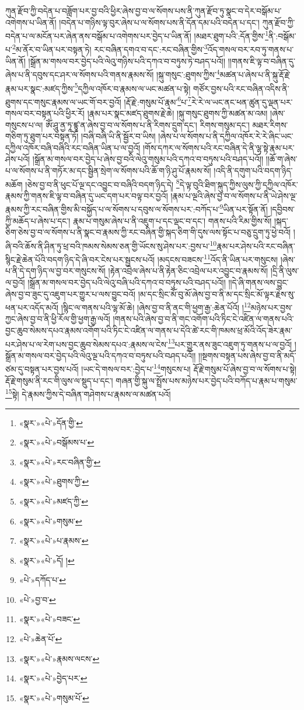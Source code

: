 ཀུན་རྫོབ་ཀྱི་བདེན་པ་བཟློག་པར་བྱ་བའི་ཕྱིར་ཞེས་བྱ་བ་ལ་སོགས་པས་ནི་ཀུན་རྫོབ་ཏུ་སྣང་བ་དེར་བསྒོམ་པ་འགེགས་པ་ཡིན་ནོ། །བདེན་པ་གཉིས་ལྟ་བུར་ཞེས་པ་ལ་སོགས་པས་ནི་དོན་དམ་པའི་བདེན་པ་དང་། ཀུན་རྫོབ་ཀྱི་བདེན་པ་ལ་མངོན་པར་ཞེན་ནས་བསྒོམ་པ་འགེགས་པར་བྱེད་པ་ཡིན་ནོ། །མཐར་ཐུག་པའི་:དོན་གྱིས་\footnote{«སྣར་»«པེ་»དོན་གྱི་}ནི་:བསྒོམ་པ་\footnote{«སྣར་»«པེ་»བསྒོམས་པ་}མ་ནོར་བ་ཡིན་པར་བསྟན་ཏེ། རང་བཞིན་དགའ་བ་དང་:རང་བཞིན་གྱིས་\footnote{«སྣར་»«པེ་»རང་བཞིན་གྱི་}འོད་གསལ་བར་རབ་ཏུ་གནས་པ་ཡིན་ནོ། །སྒྲོན་མ་གསལ་བར་བྱེད་པའི་ལེའུ་གཉིས་པའི་དཀའ་བ་བཏུས་ཏེ་བཤད་པའོ།། །།གནས་ཇི་ལྟ་བ་བཞིན་དུ་ཞེས་པ་ནི་དབུས་དང་ཤར་ལ་སོགས་པའི་གནས་རྣམས་སོ། །སྐུ་གསུང་:ཐུགས་ཀྱིས་\footnote{«སྣར་»«པེ་»ཐུགས་ཀྱི་}མཚན་པ་ཞེས་པ་ནི་སྐུ་རྡོ་རྗེ་རྣམ་པར་སྣང་:མཛད་ཀྱིས་\footnote{«སྣར་»«པེ་»མཛད་ཀྱི་}དཀྱིལ་འཁོར་བ་རྣམས་ལ་ཡང་མཚན་པ་སྟེ། གཙོར་བྱས་པའི་རང་བཞིན་འདིས་ནི་ཐུགས་དང་གསུང་རྣམས་ལ་ཡང་གོ་བར་བྱའོ། །རྡོ་རྗེ་:གསུམ་པོ་རྣམ་\footnote{«སྣར་»«པེ་»གསུམ་}པ་\footnote{«སྣར་»«པེ་»པ་རྣམས་}རེ་རེ་ལ་ཡང་ནང་ཕན་ཚུན་དུ་ལྡན་པར་གསལ་བར་བསྟན་པའི་ཕྱིར་རོ། །རྣམ་པར་སྣང་མཛད་ཐུགས་རྗེ་ཆེ། །སྐུ་གསུང་ཐུགས་ཀྱི་མཚན་མ་འམ། །ཞེས་གསུངས་པ་ལ། ཨོཾ་ཤཱུ་ནྱ་ཏཱ་ཛྙཱ་ན་ཞེས་བྱ་བ་ལ་སོགས་པ་ནི་རིགས་དྲུག་དང་། རིགས་གསུམ་དང་། མཐར་རིགས་གཅིག་ཏུ་ཐུག་པར་བསྟན་ཏོ། །བཞི་བཞི་ཡི་ནི་སྦྱོར་བ་ཡིས། །ཞེས་པ་ལ་སོགས་པ་ནི་དཀྱིལ་འཁོར་རེ་རེ་ཞིང་ཡང་དཀྱིལ་འཁོར་བཞི་བཞིའི་རང་བཞིན་ཡིན་པ་ལ་བྱའོ། །གོས་དཀར་ལ་སོགས་པའི་རང་བཞིན་དེ་ནི་ལྷ་སྟེ་རྣམ་པར་ཤེས་པའོ། །སྒྲོན་མ་གསལ་བར་བྱེད་པ་ཞེས་བྱ་བའི་ལེའུ་གསུམ་པའི་དཀའ་བ་བཏུས་པའི་བཤད་པའོ།། །།ཆོ་ག་ཞེས་པ་ལ་སོགས་པ་ནི་གཏོར་མ་དང་སྦྱིན་སྲེག་ལ་སོགས་པའི་ཆོ་ག་ཉི་ཤུ་པོ་རྣམས་སོ། །འདི་ནི་དགུག་པའི་བདག་ཉིད་མཆོག །ཅེས་བྱ་བ་ནི་ཕུང་པོ་ལྔ་དང་འབྱུང་བ་བཞིའི་བདག་ཉིད་དེ། \footnote{«སྣར་»«པེ་»དོ། ། }དེ་ལྟ་བུའི་ཐིག་སྐུད་ཀྱིས་ལུས་ཀྱི་དཀྱིལ་འཁོར་རྣམས་ཀྱི་གནས་ཇི་ལྟ་བ་བཞིན་དུ་ཡང་དག་པར་བལྟ་བར་བྱའོ། །རྣམ་པ་ལྔའི་ཞེས་བྱ་བ་ལ་སོགས་པ་ནི་ཡེ་ཤེས་ལྔ་རྣམས་ཀྱི་རང་བཞིན་གྱིས་མི་བསྐྱོད་པ་ལ་སོགས་པ་དབུས་ལ་སོགས་པར་:བཀོད་པ་\footnote{«པེ་»དཀོད་པ་}ཡིན་པར་སྟོན་ནོ། །དབྱིབས་ཀྱི་མཆོད་པ་ཞེས་པ་དང་། རྣམ་པ་གསུམ་ཞེས་པ་ནི་འཇུག་པ་དང་ལྡང་བ་དང་། གནས་པའི་རིམ་གྱིས་སོ། །སྐད་ཅིག་ཅེས་བྱ་བ་ལ་སོགས་པ་ནི་སྣང་བ་རྣམས་ཀྱི་རང་བཞིན་གྱི་སྐད་ཅིག་གི་དུས་ལས་སྟོང་པ་བཅུ་དྲུག་ཏུ་ཕྱེ་བའོ། །ཞི་བའི་ཆོས་ནི་ཤིན་ཏུ་ཕྲ་བའི་ཁམས་སེམས་ཅན་གྱི་ཡོངས་སུ་ཤེས་པར་:བྱས་པ་\footnote{«པེ་»བྱ་བ་}རྣམ་པར་ཤེས་པའི་རང་བཞིན་སྙིང་རྗེ་ཆེན་པོའི་བདག་ཉིད་དེ་ཞི་བར་ངེས་པར་སྦྱངས་པའོ། །མདངས་བཟངས་\footnote{«སྣར་»«པེ་»བཟང་}འོད་ནི་ཡིན་པར་གསུངས། །ཞེས་པ་ནི་དེ་དག་ཉིད་ལ་བྱ་བར་གསུངས་སོ། །རྟེན་འབྲེལ་ཞེས་པ་ནི་རྟེན་ཅིང་འབྲེལ་པར་འབྱུང་བ་རྣམས་སོ། །དྲི་ནི་ལུས་ལ་བྱའོ། །སྒྲོན་མ་གསལ་བར་བྱེད་པའི་ལེའུ་བཞི་པའི་དཀའ་བ་བཏུས་པའི་བཤད་པའོ།། །།དེ་ཞི་གནས་ལས་བྱུང་ཞེས་བྱ་བ་ཟུང་དུ་འཇུག་པར་གྱུར་པ་ལས་བྱུང་བའོ། །མ་དང་སྲིང་མོ་བུ་མོ་ཞེས་བྱ་བ་ནི་མ་དང་སྲིང་མོ་ལྟར་རྗེས་སུ་ཕན་པར་འདོད་མའོ། །སྙིང་ལ་གནས་པའི་ལྷ་མོ་ཆེ། །ཞེས་བྱ་བ་ནི་ནང་གི་ཕྱག་རྒྱ་:ཆེན་པོའོ། །\footnote{«པེ་»ཆེན་པོ་}མཉེས་པར་བྱས་ཀྱང་ཞེས་བྱ་བ་ནི་ཕྱི་རོལ་གྱི་ཕྱག་རྒྱ་ལའོ། །གནས་པའི་ཞེས་བྱ་བ་ནི་གང་འགོག་པའི་ཏིང་ངེ་འཛིན་ལ་གནས་པའི་བྱང་ཆུབ་སེམས་དཔའ་རྣམས་འགོག་པའི་ཏིང་ངེ་འཛིན་ལ་གནས་པ་དེའི་ཚེ་རང་གི་ཁམས་ཕྲ་མོའི་འོད་ཟེར་རྣམ་པར་ཤེས་པ་ལ་རེག་པས་བྱང་ཆུབ་སེམས་དཔའ་:རྣམས་ལ་ངེས་\footnote{«སྣར་»«པེ་»རྣམས་ལངས་}པར་གྱུར་ནས་ཟུང་འཇུག་ཏུ་གནས་པ་ལ་བྱའོ། །སྒྲོན་མ་གསལ་བར་བྱེད་པའི་ལེའུ་ལྔ་པའི་དཀའ་བ་བཏུས་པའི་བཤད་པའོ།། །།སྔགས་བསྟན་པས་ཞེས་བྱ་བ་ནི་མདོ་ཙམ་དུ་བསྟན་པར་བྱས་པའོ། །ཡང་དེ་གསལ་བར་:བྱེད་པ་\footnote{«སྣར་»«པེ་»བྱེད་པར་}གསུངས་པ། རྡོ་རྗེ་གསུམ་པོ་ཞེས་བྱ་བ་ལ་སོགས་པ་སྟེ། རྡོ་རྗེ་གསུམ་ནི་རང་གི་ལུས་ལ་སྡུད་པ་དང་། གཞན་གྱི་སྐུ་ལ་སྤྲོས་པས་མཉེས་པར་བྱེད་པའི་བཀོད་པ་རྣམ་པ་གསུམ་\footnote{«སྣར་»«པེ་»གསུམ་པོ་}སྟེ། དེ་རྣམས་ཀྱིས་དེ་བཞིན་གཤེགས་པ་རྣམས་ལ་མཚན་པའོ། 